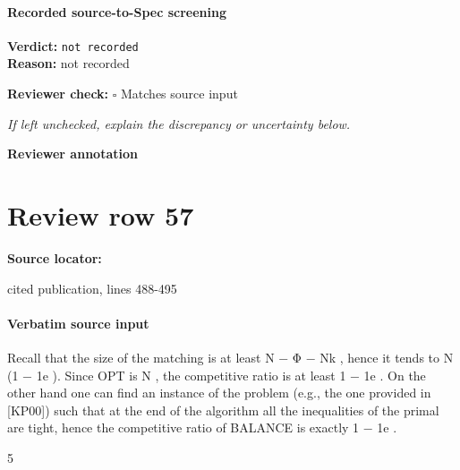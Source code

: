 \documentclass[10pt]{article}
\newcommand{\reviewerbox}{%
  \par\noindent\fbox{\parbox{0.96\linewidth}{\rule{0pt}{0.38in}}}\par
}
\newcommand{\reviewmatch}[1]{%
  \par\noindent\textbf{Reviewer check:} $\square$\; #1\par
  \noindent\emph{If left unchecked, explain the discrepancy or uncertainty below.}\par
}
\begin{document}
\paragraph{Recorded source-to-Spec screening}
\textbf{Verdict:} \texttt{not recorded}
\\
\textbf{Reason:} not recorded
\reviewmatch{Matches source input}
\noindent\textbf{Reviewer annotation}\par
\reviewerbox
\clearpage
\hypertarget{source-claim-3618f9ae86915bdc}{}
\section*{Review row 57}
\textbf{Source locator:} {\footnotesize\raggedright cited publication, lines 488-\allowbreak{}495\par}
\paragraph{Verbatim source input}
\begin{ReviewVerbatim}
Recall that the size of the matching is at least N − Φ − Nk , hence it tends to N (1 − 1e ). Since
OPT is N , the competitive ratio is at least 1 − 1e .
On the other hand one can find an instance of the problem (e.g., the one provided in [KP00])
such that at the end of the algorithm all the inequalities of the primal are tight, hence the
competitive ratio of BALANCE is exactly 1 − 1e .

5
\end{ReviewVerbatim}
\end{document}
